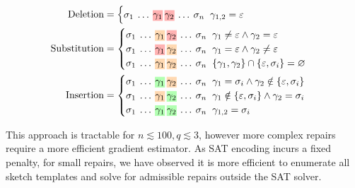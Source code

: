 \documentclass[sigplan,review,anonymous,acmsmall]{acmart}\settopmatter{printfolios=false,printccs=false,printacmref=false}
\begin{document}
\begin{align*}
  \text{Deletion}&=\begin{cases}
  \sigma_{1}\:\ldots\:\text{\hlred{$\gamma_1$}\:\hlred{$\gamma_2$}}\:\ldots\:\sigma_n\hspace{0.2cm}\gamma_{1, 2} = \varepsilon\label{eq:del}
  \end{cases}\\
  \text{Substitution}&=\begin{cases}
  \sigma_{1}\:\ldots\:\text{\hlorange{$\gamma_1$}\:\hlred{$\gamma_2$}}\:\ldots\:\sigma_n\hspace{0.2cm}\gamma_1 \neq \varepsilon \land \gamma_2 = \varepsilon\\
  \sigma_{1}\:\ldots\:\text{\hlred{$\gamma_1$}\:\hlorange{$\gamma_2$}}\:\ldots\:\sigma_n\hspace{0.2cm}\gamma_1 = \varepsilon \land \gamma_2 \neq \varepsilon\\
  \sigma_{1}\:\ldots\: \text{\hlorange{$\gamma_1$}\:\hlorange{$\gamma_2$}}\:\ldots\:\sigma_n\hspace{0.2cm}\{\gamma_1, \gamma_2\}\cap\{\varepsilon, \sigma_i\} = \varnothing
  \end{cases}\\
  \text{Insertion}&=\begin{cases}
  \sigma_{1}\:\ldots\: \text{\hlgreen{$\gamma_1$}\:\hlorange{$\gamma_2$}}\:\ldots\:\sigma_n\hspace{0.2cm}\gamma_1 = \sigma_i \land \gamma_2 \notin \{\varepsilon,  \sigma_i\}\label{eq:ins2}\\
  \sigma_{1}\:\ldots\: \text{\hlorange{$\gamma_1$}\:\hlgreen{$\gamma_2$}}\:\ldots\:\sigma_n\hspace{0.2cm}\gamma_1 \notin \{\varepsilon, \sigma_i\} \land \gamma_2 = \sigma_i\label{eq:ins1}\\
  \sigma_{1}\:\ldots\: \text{\hlgreen{$\gamma_1$}\:\hlgreen{$\gamma_2$}}\:\ldots\:\sigma_n\hspace{0.2cm}\gamma_{1,2} = \sigma_i\label{eq:copy}
  \end{cases}
\end{align*}

\noindent This approach is tractable for $n \lesssim 100, q \lesssim 3$, however more complex repairs require a more efficient gradient estimator. As SAT encoding incurs a fixed penalty, for small repairs, we have observed it is more efficient to enumerate all sketch templates and solve for admissible repairs outside the SAT solver.
\end{document}

